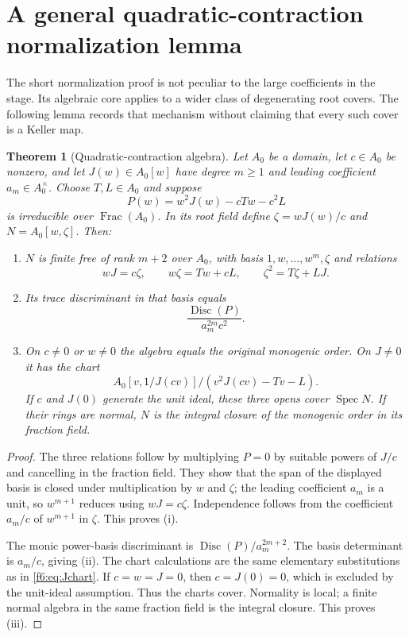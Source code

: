 \documentclass[11pt,a4paper]{article}
\newtheorem{theorem}{Theorem}[section]
\theoremstyle{definition}
\newcommand{\Spec}{\operatorname{Spec}}
\newcommand{\Disc}{\operatorname{Disc}}
\begin{document}
\section{A general quadratic-contraction normalization lemma}
\label{f6:sec:general}
The short normalization proof is not peculiar to the large coefficients
in the stage. Its algebraic core applies to a wider class of degenerating
root covers. The following lemma records that mechanism without claiming
that every such cover is a Keller map.

\begin{theorem}[Quadratic-contraction algebra]\label{f6:thm:general}
Let $A_0$ be a domain, let $c\in A_0$ be nonzero, and let
$J(w)\in A_0[w]$ have degree $m\ge1$ and leading coefficient
$a_m\in A_0^\times$. Choose $T,L\in A_0$ and suppose
\[
 P(w)=w^2J(w)-cTw-c^2L
\]
is irreducible over $\operatorname{Frac}(A_0)$. In its root field define
$\zeta=wJ(w)/c$ and $N=A_0[w,\zeta]$. Then:
\begin{enumerate}[label=\textup{(\roman*)}]
\item $N$ is finite free of rank $m+2$ over $A_0$, with basis
$1,w,\ldots,w^m,\zeta$ and relations
\[
 wJ=c\zeta,\qquad w\zeta=Tw+cL,\qquad
 \zeta^2=T\zeta+LJ.
\]
\item Its trace discriminant in that basis equals
\[
 \frac{\Disc(P)}{a_m^{2m}c^2}.
\]
\item On $c\ne0$ or $w\ne0$ the algebra equals the original monogenic
order. On $J\ne0$ it has the chart
\[
 A_0[v,1/J(cv)]/(v^2J(cv)-Tv-L).
\]
If $c$ and $J(0)$ generate the unit ideal, these three opens cover
$\Spec N$. If their rings are normal, $N$ is the integral closure of
the monogenic order in its fraction field.
\end{enumerate}
\end{theorem}
\begin{proof}
The three relations follow by multiplying $P=0$ by suitable powers of
$J/c$ and cancelling in the fraction field. They show that the span of
the displayed basis is closed under multiplication by $w$ and $\zeta$;
the leading coefficient $a_m$ is a unit, so $w^{m+1}$ reduces using
$wJ=c\zeta$. Independence follows from the coefficient $a_m/c$ of
$w^{m+1}$ in $\zeta$. This proves (i).

The monic power-basis discriminant is
$\Disc(P)/a_m^{2m+2}$. The basis determinant is $a_m/c$, giving (ii).
The chart calculations are the same elementary substitutions as in
\eqref{f6:eq:Jchart}. If $c=w=J=0$, then $c=J(0)=0$, which is excluded by
the unit-ideal assumption. Thus the charts cover. Normality is local;
a finite normal algebra in the same fraction field is the integral
closure. This proves (iii).
\end{proof}
\end{document}

